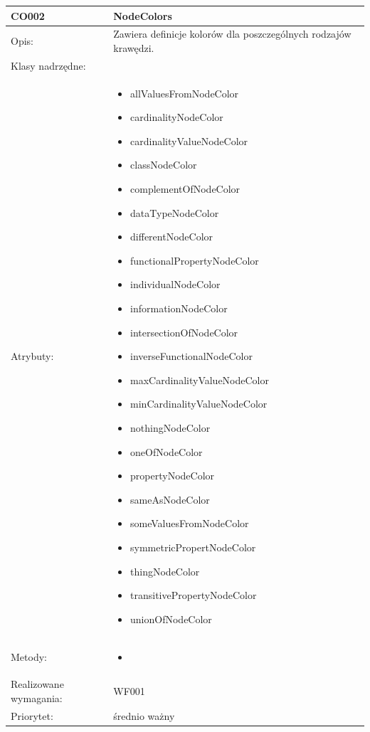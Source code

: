 \documentclass[a4paper,10pt]{article}
\begin{document}
\begin{center}
\begin{longtable}{|m{3cm}|m{9cm}|}
CO002 & NodeColors \\ \hline
Opis: & Zawiera definicje kolorów dla poszczególnych rodzajów krawędzi.   \\ \hline
Klasy nadrzędne: &     \\ \hline
Atrybuty: & \begin{itemize}
 \item allValuesFromNodeColor
 \item cardinalityNodeColor
 \item cardinalityValueNodeColor
 \item classNodeColor
 \item complementOfNodeColor
 \item dataTypeNodeColor
 \item differentNodeColor
 \item functionalPropertyNodeColor
 \item individualNodeColor
 \item informationNodeColor
 \item intersectionOfNodeColor
 \item inverseFunctionalNodeColor
 \item maxCardinalityValueNodeColor
 \item minCardinalityValueNodeColor
 \item nothingNodeColor
 \item oneOfNodeColor
 \item propertyNodeColor
 \item sameAsNodeColor
 \item someValuesFromNodeColor
 \item symmetricPropertNodeColor
 \item thingNodeColor
 \item transitivePropertyNodeColor
 \item unionOfNodeColor 
\end{itemize}
 \\ \hline
Metody: & \begin{itemize}
 \item 
\end{itemize}
  \\ \hline
Realizowane wymagania: & WF001 \\ \hline
Priorytet: & średnio ważny \\ \hline


\end{longtable}


\end{center}
\end{document}
